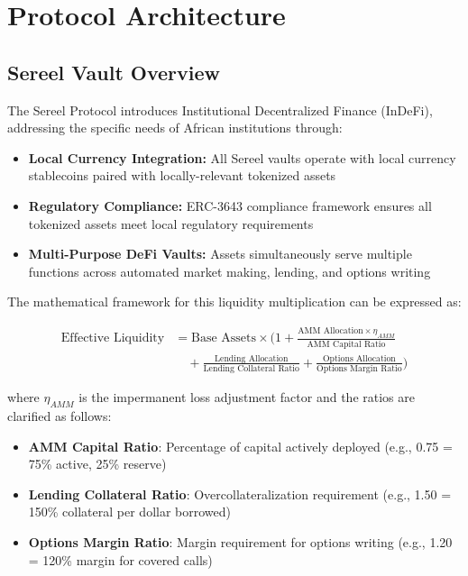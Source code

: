 \documentclass[12pt]{article}
\begin{document}
\section{Protocol Architecture}
\subsection{Sereel Vault Overview}
The Sereel Protocol introduces Institutional Decentralized Finance (InDeFi), addressing the specific needs of African institutions through:

\begin{itemize}
  \item \textbf{Local Currency Integration:} All Sereel vaults operate with local currency stablecoins paired with locally-relevant tokenized assets
  \item \textbf{Regulatory Compliance:} ERC-3643 compliance framework ensures all tokenized assets meet local regulatory requirements
  \item \textbf{Multi-Purpose DeFi Vaults:} Assets simultaneously serve multiple functions across automated market making, lending, and options writing
\end{itemize}

The mathematical framework for this liquidity multiplication can be expressed as:

\begin{align}
\text{Effective Liquidity} &= \text{Base Assets} \times \Bigg(1 + \frac{\text{AMM Allocation} \times \eta_{AMM}}{\text{AMM Capital Ratio}} \nonumber\\
&\quad + \frac{\text{Lending Allocation}}{\text{Lending Collateral Ratio}} + \frac{\text{Options Allocation}}{\text{Options Margin Ratio}}\Bigg)
\end{align}

where $\eta_{AMM}$ is the impermanent loss adjustment factor and the ratios are clarified as follows:
\begin{itemize}
\item \textbf{AMM Capital Ratio}: Percentage of capital actively deployed (e.g., 0.75 = 75\% active, 25\% reserve)
\item \textbf{Lending Collateral Ratio}: Overcollateralization requirement (e.g., 1.50 = 150\% collateral per dollar borrowed)
\item \textbf{Options Margin Ratio}: Margin requirement for options writing (e.g., 1.20 = 120\% margin for covered calls)
\end{itemize}
\end{document}
